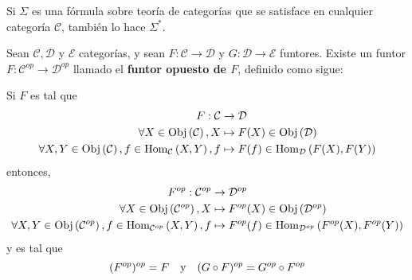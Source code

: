 \documentclass[12pt]{report}
\theoremstyle{largebreak}
\newcommand\cf[3]{\ensuremath{#1:#2\rightarrow#3}}
\newcommand{\Obj}[1]{\ensuremath{\textup{Obj}\left(#1\right)}}
\newcommand{\Hom}[3]{\ensuremath{\textup{Hom}_{#1}\left(#2,#3\right)}}
\begin{document}
    \begin{propo}
        Si $\Sigma$ es una fórmula sobre teoría de categorías que se satisface en cualquier categoría $\mathcal{C}$, también lo hace $\Sigma^*$.
    \end{propo}

    \begin{mydef}
        Sean $\mathcal{C},\mathcal{D}$ y $\mathcal{E}$ categorías, y sean $\cf{F}{\mathcal{C}}{\mathcal{D}}$ y $\cf{G}{\mathcal{D}}{\mathcal{E}}$ funtores. Existe un funtor $\cf{F}{\mathcal{C}^{op}}{\mathcal{D}^{op}}$ llamado el \textbf{funtor opuesto de $F$}, definido como sigue:

        Si $F$ es tal que
        \begin{equation*}
            \begin{split}
                F:\mathcal{C}&\rightarrow \mathcal{D} \\
                \forall X\in\Obj{\mathcal{C}}, X&\mapsto F(X)\in\Obj{\mathcal{D}}\\
                \forall X,Y\in\Obj{\mathcal{C}},f\in\Hom{\mathcal{C}}{X}{Y}, f&\mapsto F(f)\in\Hom{\mathcal{D}}{F(X)}{F(Y)}\\
            \end{split}
        \end{equation*}
        entonces,
        \begin{equation*}
            \begin{split}
                F^{op}:\mathcal{C}^{op}&\rightarrow \mathcal{D}^{op} \\
                \forall X\in\Obj{\mathcal{C}^{op}}, X&\mapsto F^{op}(X)\in\Obj{\mathcal{D}^{op}}\\
                \forall X,Y\in\Obj{\mathcal{C}^{op}},f\in\Hom{\mathcal{C}^{op}}{X}{Y}, f&\mapsto F^{op}(f)\in\Hom{\mathcal{D}^{op}}{F^{op}(X)}{F^{op}(Y)}\\
            \end{split}
        \end{equation*}
        y es tal que
        \begin{equation*}
            (F^{op})^{op}=F\quad\textup{y}\quad (G\circ F)^{op}=G^{op}\circ F^{op}
        \end{equation*}
    \end{mydef}
\end{document}
